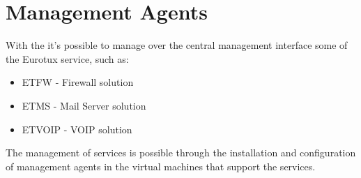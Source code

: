 
\chapter{\textsf{Management Agents}}

With the \acronym it's possible to manage over the central management interface some of the Eurotux service, such as:
\begin{itemize}
	\item ETFW - Firewall solution
	\item ETMS - Mail Server solution
	\item ETVOIP - VOIP solution
\end{itemize}
    
The management of services is possible through the installation and configuration of management agents in the virtual machines that support the services.



\pagebreak

\pagebreak



